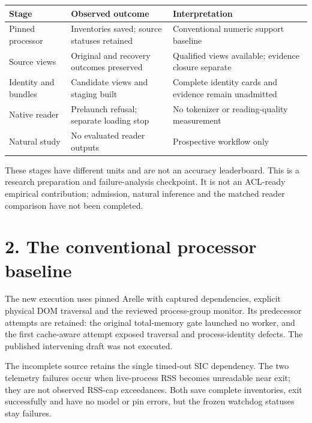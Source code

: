 \documentclass[10pt,a4paper]{article}
\begin{document}
\begin{longtable}{@{}p{}p{}p{}@{}}\toprule
\textbf{Stage} & \textbf{Observed outcome} & \textbf{Interpretation} \\ \midrule\endhead
Pinned processor & Inventories saved; source statuses retained & Conventional numeric support baseline \\
Source views & Original and recovery outcomes preserved & Qualified views available; evidence closure separate \\
Identity and bundles & Candidate views and staging built & Complete identity cards and evidence remain unadmitted \\
Native reader & Prelaunch refusal; separate loading stop & No tokenizer or reading-quality measurement \\
Natural study & No evaluated reader outputs & Prospective workflow only \\
\bottomrule\end{longtable}
{\small These stages have different units and are not an accuracy leaderboard.}
This is a research preparation and failure-analysis checkpoint. It is not an ACL-ready empirical contribution; admission, natural inference and the matched reader comparison have not been completed.

\clearpage
\section*{2. The conventional processor baseline}
The new execution uses pinned Arelle with captured dependencies, explicit physical DOM traversal and the reviewed process-group monitor. Its predecessor attempts are retained: the original total-memory gate launched no worker, and the first cache-aware attempt exposed traversal and process-identity defects. The published intervening draft was not executed.

The incomplete source retains the single timed-out SIC dependency. The two telemetry failures occur when live-process RSS becomes unreadable near exit; they are not observed RSS-cap exceedances. Both save complete inventories, exit successfully and have no model or pin errors, but the frozen watchdog statuses stay failures.
\end{document}
